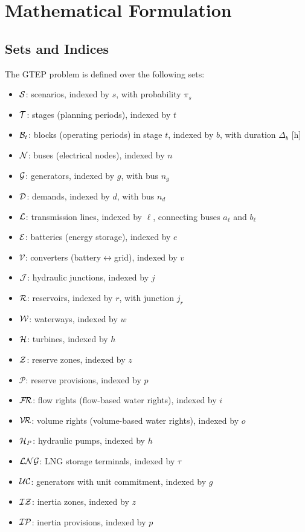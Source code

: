 
\section{Mathematical Formulation}
\label{sec:formulation}

\subsection{Sets and Indices}

The GTEP problem is defined over the following sets:

\begin{itemize}
  \item $\mathcal{S}$: scenarios, indexed by $s$, with probability $\pi_s$
  \item $\mathcal{T}$: stages (planning periods), indexed by $t$
  \item $\mathcal{B}_t$: blocks (operating periods) in stage $t$, indexed by $b$,
        with duration $\Delta_b$ [h]
  \item $\mathcal{N}$: buses (electrical nodes), indexed by $n$
  \item $\mathcal{G}$: generators, indexed by $g$, with bus $n_g$
  \item $\mathcal{D}$: demands, indexed by $d$, with bus $n_d$
  \item $\mathcal{L}$: transmission lines, indexed by $\ell$, connecting buses
        $a_\ell$ and $b_\ell$
  \item $\mathcal{E}$: batteries (energy storage), indexed by $e$
  \item $\mathcal{V}$: converters (battery$\leftrightarrow$grid), indexed by $v$
  \item $\mathcal{J}$: hydraulic junctions, indexed by $j$
  \item $\mathcal{R}$: reservoirs, indexed by $r$, with junction $j_r$
  \item $\mathcal{W}$: waterways, indexed by $w$
  \item $\mathcal{H}$: turbines, indexed by $h$
  \item $\mathcal{Z}$: reserve zones, indexed by $z$
  \item $\mathcal{P}$: reserve provisions, indexed by $p$
  \item $\mathcal{F\!R}$: flow rights (flow-based water rights), indexed by $i$
  \item $\mathcal{V\!R}$: volume rights (volume-based water rights), indexed by $o$
  \item $\mathcal{H}_P$: hydraulic pumps, indexed by $h$
  \item $\mathcal{LNG}$: LNG storage terminals, indexed by $\tau$
  \item $\mathcal{UC}$: generators with unit commitment, indexed by $g$
  \item $\mathcal{IZ}$: inertia zones, indexed by $z$
  \item $\mathcal{IP}$: inertia provisions, indexed by $p$
\end{itemize}

